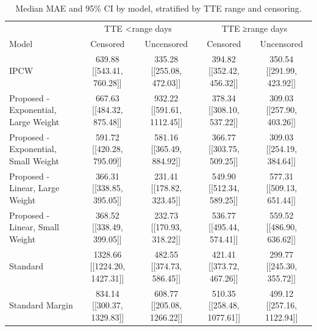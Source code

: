 \begin{table}[ht]
\centering
\scriptsize
\begin{tabular}{lcccc}
\toprule
& \multicolumn{2}{c}{TTE <range days} & \multicolumn{2}{c}{TTE ≥range days} \\
Model & Censored & Uncensored & Censored & Uncensored \\
\midrule
IPCW & 639.88 [[543.41, 760.28]] & 335.28 [[255.08, 472.03]] & 394.82 [[352.42, 456.32]] & 350.54 [[291.99, 423.92]] \\
Proposed - Exponential, Large Weight & 667.63 [[484.32, 875.48]] & 932.22 [[591.61, 1112.45]] & 378.34 [[308.10, 537.22]] & 309.03 [[257.90, 403.26]] \\
Proposed - Exponential, Small Weight & 591.72 [[420.28, 795.09]] & 581.16 [[365.49, 884.92]] & 366.77 [[303.75, 509.25]] & 309.03 [[254.19, 384.64]] \\
Proposed - Linear, Large Weight & 366.31 [[338.85, 395.05]] & 231.41 [[178.82, 323.45]] & 549.90 [[512.34, 589.25]] & 577.31 [[509.13, 651.44]] \\
Proposed - Linear, Small Weight & 368.52 [[338.49, 399.05]] & 232.73 [[170.93, 318.22]] & 536.77 [[495.44, 574.41]] & 559.52 [[486.90, 636.62]] \\
Standard & 1328.66 [[1224.20, 1427.31]] & 482.55 [[374.73, 586.45]] & 421.41 [[373.72, 467.26]] & 299.77 [[245.30, 355.72]] \\
Standard
Margin & 834.14 [[300.37, 1329.83]] & 608.77 [[205.08, 1266.22]] & 510.35 [[258.48, 1077.61]] & 499.12 [[257.16, 1122.94]] \\
\bottomrule
\end{tabular}
\caption{Median MAE and 95\% CI by model, stratified by TTE range and censoring.}
\label{tab:mae_combined}
\end{table}